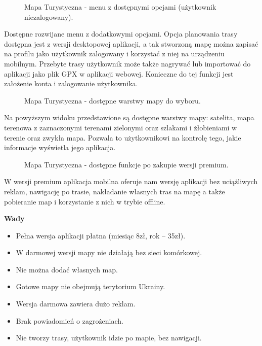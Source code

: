 \begin{figure}[H]
    \centering
    \caption{Mapa Turystyczna - menu z dostępnymi opcjami (użytkownik niezalogowany).}
    \label{mapatu:menu}
\end{figure}
Dostępne rozwijane menu z dodatkowymi opcjami. Opcja planowania trasy dostępna jest z wersji desktopowej aplikacji, a tak stworzoną mapę można zapisać na profilu jako użytkownik zalogowany i korzystać z niej na urządzeniu mobilnym. Przebyte trasy użytkownik może także nagrywać lub importować do aplikacji jako plik GPX w aplikacji webowej. Konieczne do tej funkcji jest założenie konta i zalogowanie użytkownika.
\begin{figure}[H]
    \centering
    \caption{Mapa Turystyczna - dostępne warstwy mapy do wyboru.}
    \label{mapatu:warstwy}
\end{figure}
Na powyższym widoku przedstawione są dostępne warstwy mapy: satelita, mapa terenowa z zaznaczonymi terenami zielonymi oraz szlakami i żłobieniami w terenie oraz zwykła mapa. Pozwala to użytkownikowi na kontrolę tego, jakie informacje wyświetla jego aplikacja. 
\begin{figure}[H]
    \centering
    \caption{Mapa Turystyczna - dostępne funkcje po zakupie wersji premium.}
    \label{mapatu:premium}
\end{figure}
W wersji premium aplikacja mobilna oferuje nam wersję aplikacji bez uciążliwych reklam, nawigację po trasie, nakładanie własnych tras na mapę a także pobieranie map i korzystanie z nich w trybie offline.

\textbf{Wady}
\begin{itemize}
    \item Pełna wersja aplikacji płatna (miesiąc 8zł, rok – 35zł).
    \item W darmowej wersji mapy nie działają bez sieci komórkowej.
    \item Nie można dodać własnych map.
    \item Gotowe mapy nie obejmują terytorium Ukrainy.
    \item Wersja darmowa zawiera dużo reklam.
    \item Brak powiadomień o zagrożeniach.
    \item Nie tworzy trasy, użytkownik idzie po mapie, bez nawigacji.
\end{itemize}

